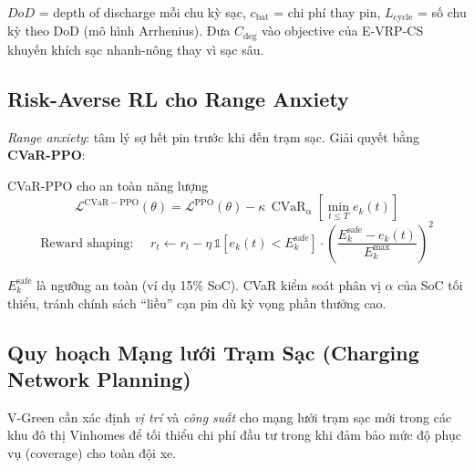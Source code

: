 \documentclass[12pt,a4paper]{article}
\DeclareMathOperator{\CVaR}{CVaR}
\begin{document}
$DoD$ = depth of discharge mỗi chu kỳ sạc, $c_{\mathrm{bat}}$ = chi phí thay pin,
$L_{\mathrm{cycle}}$ = số chu kỳ theo DoD (mô hình Arrhenius). Đưa $C_{\mathrm{deg}}$
vào objective của E-VRP-CS khuyến khích sạc nhanh-nông thay vì sạc sâu.

\subsection{Risk-Averse RL cho Range Anxiety}

\emph{Range anxiety}: tâm lý sợ hết pin trước khi đến trạm sạc.
Giải quyết bằng \textbf{CVaR-PPO}:

\begin{formulabox}{CVaR-PPO cho an toàn năng lượng}
\begin{equation}
  \mathcal{L}^{\mathrm{CVaR-PPO}}(\theta)
  = \mathcal{L}^{\mathrm{PPO}}(\theta)
  - \kappa\,\CVaR_\alpha\!\left[\min_{t\leq T}e_k(t)\right]
\end{equation}
\begin{equation}
  \text{Reward shaping: }\quad
  r_t \leftarrow r_t - \eta\,\mathbb{1}[e_k(t) < E_k^{\mathrm{safe}}]
  \cdot \left(\frac{E_k^{\mathrm{safe}} - e_k(t)}{E_k^{\mathrm{max}}}\right)^2
\end{equation}
\end{formulabox}

$E_k^{\mathrm{safe}}$ là ngưỡng an toàn (ví dụ 15\% SoC). CVaR kiểm soát
phân vị $\alpha$ của SoC tối thiểu, tránh chính sách ``liều'' cạn pin
dù kỳ vọng phần thưởng cao.

\subsection{Quy hoạch Mạng lưới Trạm Sạc (Charging Network Planning)}

V-Green cần xác định \emph{vị trí} và \emph{công suất} cho mạng lưới trạm sạc mới
trong các khu đô thị Vinhomes để tối thiểu chi phí đầu tư trong khi đảm bảo
mức độ phục vụ (coverage) cho toàn đội xe.
\end{document}
